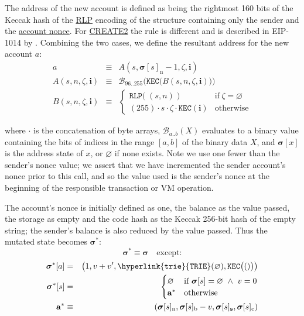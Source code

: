 \documentclass[9pt,oneside]{amsart}
\begin{document}
\begin{multicols}{2}
The address of the new account is defined as being the rightmost 160 bits of the Keccak hash of the \hyperlink{rlp}{RLP} encoding of the structure containing only the sender and the \hyperlink{account_nonce}{account nonce}.
For {\small \hyperlink{create2}{CREATE2}} the rule is different and is described in EIP-1014 by \cite{EIP-1014}.
Combining the two cases, we define the resultant address for the new account $a$:
\begin{eqnarray}
a & \equiv & A(s, \boldsymbol{\sigma}[s]_{\mathrm{n}} - 1, \zeta, \mathbf{i}) \\
\label{eq:new-address} A(s, n, \zeta, \mathbf{i}) & \equiv & \mathcal{B}_{96..255}\Big(\mathtt{KEC}\big(B(s, n, \zeta, \mathbf{i})\big)\Big) \\
B(s, n, \zeta, \mathbf{i}) & \equiv & \begin{cases}
\mathtt{RLP}\big(\;(s, n)\;\big) & \text{if}\ \zeta = \varnothing \\
(255) \cdot s \cdot \zeta \cdot \mathtt{KEC}(\mathbf{i}) & \text{otherwise}
\end{cases}
\end{eqnarray}

where $\cdot$ is the concatenation of byte arrays, $\mathcal{B}_{a..b}(X)$ evaluates to a binary value containing the bits of indices in the range $[a, b]$ of the binary data $X$, and $\boldsymbol{\sigma}[x]$ is the address state of $x$, or $\varnothing$ if none exists. Note we use one fewer than the sender's nonce value; we assert that we have incremented the sender account's nonce prior to this call, and so the value used is the sender's nonce at the beginning of the responsible transaction or VM operation.

The account's nonce is initially defined as one, the balance as the value passed, the storage as empty and the code hash as the Keccak 256-bit hash of the empty string; the sender's balance is also reduced by the value passed. Thus the mutated state becomes $\boldsymbol{\sigma}^*$:
\begin{equation}
\boldsymbol{\sigma}^* \equiv \boldsymbol{\sigma} \quad \text{except:}
\end{equation}
\begin{eqnarray}
\boldsymbol{\sigma}^*[a] &=& \big( 1, v + v', \mathtt{\hyperlink{trie}{TRIE}}(\varnothing), \mathtt{KEC}\big(()\big) \big) \\
\boldsymbol{\sigma}^*[s] &=& \begin{cases}
\varnothing & \text{if}\ \boldsymbol{\sigma}[s] = \varnothing \ \wedge\ v = 0 \\
\mathbf{a}^* & \text{otherwise}
\end{cases} \\
\mathbf{a}^* &\equiv& (\boldsymbol{\sigma}[s]_{\mathrm{n}}, \boldsymbol{\sigma}[s]_{\mathrm{b}} - v, \boldsymbol{\sigma}[s]_{\mathbf{s}}, \boldsymbol{\sigma}[s]_{\mathrm{c}})
\end{eqnarray}


\end{multicols}
\end{document}
